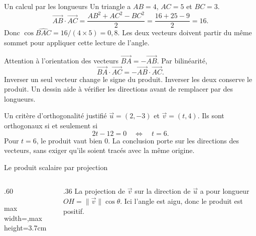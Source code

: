 \documentclass[aspectratio=169,12pt]{beamer}
\begin{document}
\renewcommand{\slidekind}{MÉTHODE \& EXEMPLE}
\begin{frame}[t,fragile]{Un calcul par les longueurs}
Un triangle a $AB=4$, $AC=5$ et $BC=3$.\[\overrightarrow{AB}\cdot\overrightarrow{AC}=\frac{AB^2+AC^2-BC^2}{2}=\frac{16+25-9}{2}=16.\] Donc $\cos\widehat{BAC}=16/(4\times5)=0,8$. Les deux vecteurs doivent partir du même sommet pour appliquer cette lecture de l’angle.
\end{frame}
\renewcommand{\slidekind}{COMPRENDRE}
\begin{frame}[t,fragile]{Attention à l’orientation des vecteurs}
$\overrightarrow{BA}=-\overrightarrow{AB}$. Par bilinéarité,\[\overrightarrow{BA}\cdot\overrightarrow{AC}=-\overrightarrow{AB}\cdot\overrightarrow{AC}.\] Inverser un seul vecteur change le signe du produit. Inverser les deux conserve le produit. Un dessin aide à vérifier les directions avant de remplacer par des longueurs.
\end{frame}
\renewcommand{\slidekind}{JUSTIFIER}
\begin{frame}[t,fragile]{Un critère d’orthogonalité justifié}
$\vec u=(2,-3)$ et $\vec v=(t,4)$. Ils sont orthogonaux si et seulement si\[2t-12=0\quad\Longleftrightarrow\quad t=6.\] Pour $t=6$, le produit vaut bien $0$. La conclusion porte sur les directions des vecteurs, sans exiger qu’ils soient tracés avec la même origine.
\end{frame}
\renewcommand{\slidekind}{COMPRENDRE}
\begin{frame}[t,fragile]{Le produit scalaire par projection}
\begin{columns}[c,onlytextwidth]\begin{column}{.60\textwidth}\centering\begin{adjustbox}{max width=\linewidth,max height=3.7cm}\end{adjustbox}\end{column}\begin{column}{.36\textwidth} La projection de $\vec v$ sur la direction de $\vec u$ a pour longueur $OH=\|\vec v\|\cos\theta$. Ici l’angle est aigu, donc le produit est positif.\end{column}\end{columns}
\end{frame}
\end{document}
